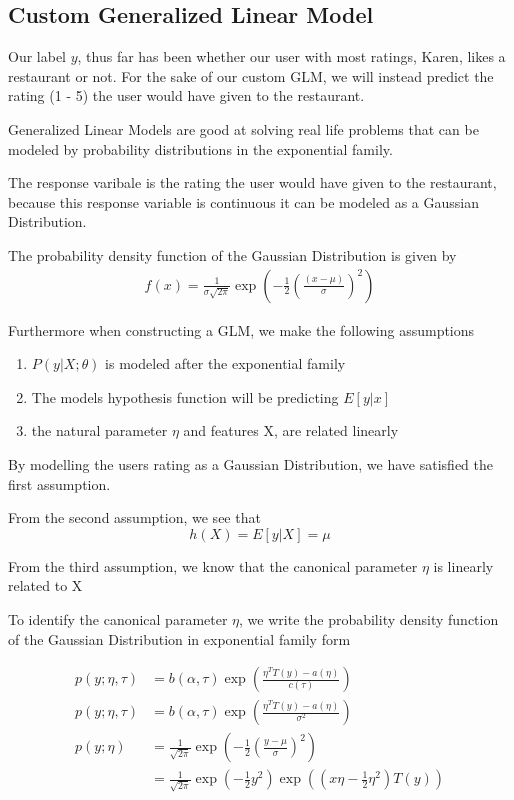 \documentclass{sigchi}
\begin{document}
\subsection{Custom Generalized Linear Model}
Our label $y$, thus far has been whether our user with most ratings, Karen, likes a restaurant or not. 
For the sake of our custom GLM, we will instead predict the rating (1 - 5) the user would have given to the restaurant.

Generalized Linear Models are good at solving real life problems that can be modeled by probability distributions in the exponential family.

The response varibale is the rating the user would have given to the restaurant, because this response variable is continuous it can be modeled as a Gaussian Distribution.

The probability density function of the Gaussian Distribution is given by
\begin{align*}
  f(x) = \frac{1}{\sigma\sqrt{2\pi}} \exp\left(-\frac{1}{2} \left(\frac{(x - \mu)}{\sigma}\right)^2\right)
\end{align*}

Furthermore when constructing a GLM, we make the following assumptions

\begin{enumerate}
    \item $P(y|X; \theta)$ is modeled after the exponential family
    \item The models hypothesis function will be predicting $E[y|x]$
    \item the natural parameter $\eta$ and features X, are related linearly
\end{enumerate}

By modelling the users rating as a Gaussian Distribution, we have satisfied the first assumption.

From the second assumption, we see that $$h(X) = E[y|X] = \mu$$

From the third assumption, we know that the canonical parameter $\eta$ is linearly related to X

To identify the canonical parameter $\eta$, we write the probability density function of the Gaussian Distribution in exponential family form

\begin{align*}
  p(y; \eta, \tau) &= b(\alpha, \tau) \exp\left(\frac{\eta^T T(y) - a(\eta)}{c(\tau)}\right) \\
  p(y; \eta, \tau) &= b(\alpha, \tau) \exp\left(\frac{\eta^T T(y) - a(\eta)}{\sigma^2}\right) \\
  p(y ; \eta) &= \frac{1}{\sqrt{2\pi}} \exp\left(-\frac{1}{2}\left(\frac{y - \mu}{\sigma}\right)^2\right) \\
  &= \frac{1}{\sqrt{2\pi}} \exp\left(-\frac{1}{2}y^2\right) \exp\left( (x\eta - \frac{1}{2}\eta^2) T(y) \right)
\end{align*}
\end{document}
